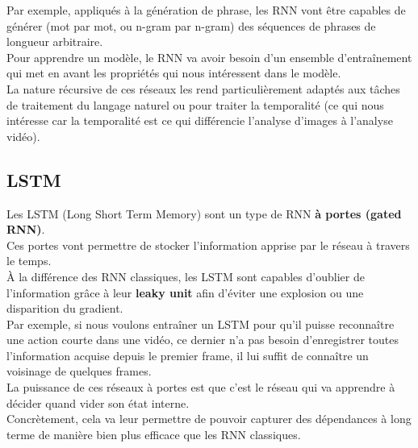 \documentclass[11pt]{article}
\begin{document}
Par exemple, appliqués à la génération de phrase, les RNN vont être capables de générer (mot par mot, ou n-gram par n-gram) des séquences de phrases de longueur arbitraire.\\

Pour apprendre un modèle, le RNN va avoir besoin d'un ensemble d'entraînement qui met en avant les propriétés qui nous intéressent dans le modèle.\\

La nature récursive de ces réseaux les rend particulièrement adaptés aux tâches de traitement du langage naturel ou pour traiter la temporalité (ce qui nous intéresse car la temporalité est ce qui différencie l'analyse d'images à l'analyse vidéo).\\

\subsection{LSTM}
\label{sec:orgacadfde}
Les LSTM (Long Short Term Memory) sont un type de RNN \textbf{à portes (gated RNN)}.\\
Ces portes vont permettre de stocker l'information apprise par le réseau à travers le temps.\\
À la différence des RNN classiques, les LSTM sont capables d'oublier de l'information grâce à leur \textbf{leaky unit} afin d'éviter une explosion ou une disparition du gradient.\\
Par exemple, si nous voulons entraîner un LSTM pour qu'il puisse reconnaître une action courte dans une vidéo, ce dernier n'a pas besoin d'enregistrer toutes l'information acquise depuis le premier frame, il lui suffit de connaître un voisinage de quelques frames.\\
La puissance de ces réseaux à portes est que c'est le réseau qui va apprendre à décider quand vider son état interne.\\
Concrètement, cela va leur permettre de pouvoir capturer des dépendances à long terme de manière bien plus efficace que les RNN classiques.\\
\end{document}
